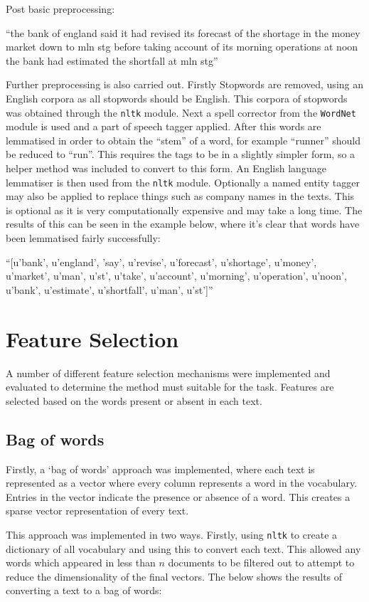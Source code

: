 \documentclass{article}
\begin{document}
Post basic preprocessing:

``the bank of england said it had revised its forecast of the shortage in the money market down to mln stg before taking account of its morning operations at noon the bank had estimated the shortfall at mln stg''

Further preprocessing is also carried out. Firstly Stopwords are removed, using an English corpora as all stopwords should be English. This corpora of stopwords was obtained through the \verb|nltk| module. Next a spell corrector from the \verb|WordNet| module is used and a part of speech tagger applied. After this words are lemmatised in order to obtain the ``stem'' of a word, for example ``runner'' should be reduced to ``run''. This requires the tags to be in a slightly simpler form, so a helper method was included to convert to this form. An English language lemmatiser is then used from the \verb|nltk| module. Optionally a named entity tagger may also be applied to replace things such as company names in the texts. This is optional as it is very computationally expensive and may take a long time. The results of this can be seen in the example below, where it's clear that words have been lemmatised fairly successfully:

``[u'bank', u'england', 'say', u'revise', u'forecast', u'shortage', u'money', u'market', u'man', u'st', u'take', u'account', u'morning', u'operation', u'noon', u'bank', u'estimate', u'shortfall', u'man', u'st']''

\section{Feature Selection}
A number of different feature selection mechanisms were implemented and evaluated to determine the method must suitable for the task. Features are selected based on the words present or absent in each text.

\subsection{Bag of words}
Firstly, a `bag of words' approach was implemented, where each text is represented as a vector where every column represents a word in the vocabulary. Entries in the vector indicate the presence or absence of a word. This creates a sparse vector representation of every text.

This approach was implemented in two ways. Firstly, using \verb|nltk| to create a dictionary of all vocabulary and using this to convert each text. This allowed any words which appeared in less than $n$ documents to be filtered out to attempt to reduce the dimensionality of the final vectors. The below shows the results of converting a text to a bag of words:
\end{document}
